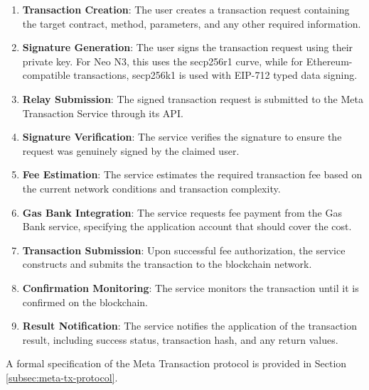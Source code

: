 \documentclass{article}
\begin{document}
\begin{enumerate}
    \item \textbf{Transaction Creation}: The user creates a transaction request containing the target contract, method, parameters, and any other required information.
    
    \item \textbf{Signature Generation}: The user signs the transaction request using their private key. For Neo N3, this uses the secp256r1 curve, while for Ethereum-compatible transactions, secp256k1 is used with EIP-712 typed data signing.
    
    \item \textbf{Relay Submission}: The signed transaction request is submitted to the Meta Transaction Service through its API.
    
    \item \textbf{Signature Verification}: The service verifies the signature to ensure the request was genuinely signed by the claimed user.
    
    \item \textbf{Fee Estimation}: The service estimates the required transaction fee based on the current network conditions and transaction complexity.
    
    \item \textbf{Gas Bank Integration}: The service requests fee payment from the Gas Bank service, specifying the application account that should cover the cost.
    
    \item \textbf{Transaction Submission}: Upon successful fee authorization, the service constructs and submits the transaction to the blockchain network.
    
    \item \textbf{Confirmation Monitoring}: The service monitors the transaction until it is confirmed on the blockchain.
    
    \item \textbf{Result Notification}: The service notifies the application of the transaction result, including success status, transaction hash, and any return values.
\end{enumerate}

A formal specification of the Meta Transaction protocol is provided in Section \ref{subsec:meta-tx-protocol}.


\end{document}
